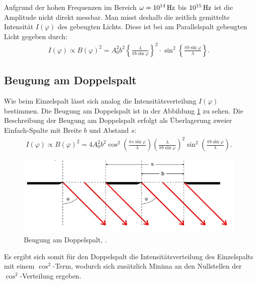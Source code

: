 Aufgrund der hohen Frequenzen im Bereich $\omega = \SI{E14}{\Hz}$ bis $\SI{E15}{\Hz}$ ist die Amplitude nicht direkt messbar. Man misst deshalb die zeitlich gemittelte Intensität $I(\varphi)$ des gebeugten Lichts. Diese ist bei am Parallelspalt gebeugten Licht gegeben durch:
\begin{equation}
\begin{aligned}
I(\varphi) \propto B(\varphi)^2 = A_0^2 b^2 \left\{\frac{\lambda}{\pi b\sin\varphi}\right\}^2\cdot\sin^2\left\{\frac{\pi b\sin\varphi}{\lambda}\right\}\text{.} 
\label{eq:eq5}
\end{aligned}
\end{equation}

\subsection{Beugung am Doppelspalt}
Wie beim Einzelspalt lässt sich analog die Intensitätsverteilung $I(\varphi)$ bestimmen. Die Beugung am Doppelspalt ist in der Abbildung \ref{fig:beugungamdoppelspalt} zu sehen. Die Beschreibung der Beugung am Doppelspalt erfolgt als Überlagerung zweier Einfach-Spalte mit Breite $b$ und Abstand $s$:
\begin{align}
I(\varphi) \propto B(\varphi)^2 = 4 A_{0}^{2} b^{2}\cos^2\left(\frac{\pi s\sin\varphi}{\lambda}\right)\left(\frac{\lambda}{\pi b \sin\varphi}\right)^2\sin^2\left(\frac{\pi b\sin\varphi}{\lambda}\right)\text{.}
\label{eq:dsg}
\end{align}
\begin{figure}[h!]
	\centering
	\includegraphics[width=0.9\linewidth]{BeugungamDoppelspalt.jpg}
	\caption{Beugung am Doppelspalt, \cite[4]{anleitung406}.}
	\label{fig:beugungamdoppelspalt}
\end{figure}
Es ergibt sich somit für den Doppelspalt die Intensitätsverteilung des Einzelspalts mit einem $\cos^2$-Term, wodurch sich zusätzlich Minima an den Nullstellen der $\cos^2$-Verteilung ergeben. 

